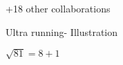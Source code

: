 \documentclass[8pt]{article}
\begin{document}
{\footnotesize
\def\arraystretch{1.1}
\begin{longtable}{rl}
    
    
\end{longtable}
}

\vspace{-0.5cm} 

\begin{center}
    \color{black!50}
    +18 other collaborations
\end{center}

% 

\vspace{-0.2cm}
\begin{center}
{\small Ultra running\space\space - \space\space Illustration\space\space }
\end{center}

\hspace*{0pt}\hfill $\sqrt{81} = 8 + 1$
\end{document}
